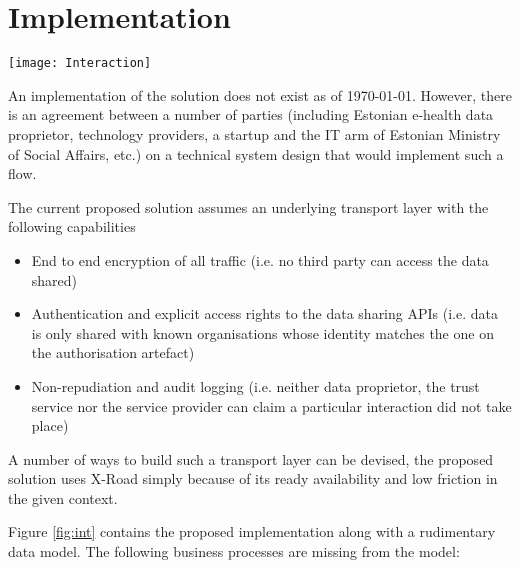 \documentclass[nobib]{tufte-handout}
\begin{document}
\section{Implementation}
\begin{figure*}
  \texttt{[image: Interaction]}
  \caption{A detailed technical interaction diagram of the authorisation process}
  \label{fig:int}
\end{figure*}
An implementation of the solution does not exist as of \today. However, there is an agreement between a number of parties (including Estonian e-health data proprietor, technology providers, a startup and the IT arm of Estonian Ministry of Social Affairs, etc.) on a technical system design that would implement such a flow.

The current proposed solution assumes an underlying transport layer with the following capabilities
\begin{itemize}
	\item End to end encryption of all traffic (i.e. no third party can access the data shared)
	\item Authentication and explicit access rights to the data sharing APIs (i.e. data is only shared with known organisations whose identity matches the one on the authorisation artefact)
	\item Non-repudiation and audit logging (i.e. neither data proprietor, the trust service nor the service provider can claim a particular interaction did not take place)
\end{itemize}

A number of ways to build such a transport layer can be devised, the proposed solution uses X-Road simply because of its ready availability and low friction in the given context.

Figure \ref{fig:int} contains the proposed implementation along with a rudimentary data model. The following business processes are missing from the model:
\end{document}
